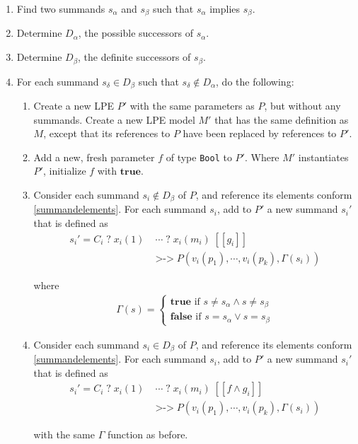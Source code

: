 \begin{enumerate}
\item Find two summands $s_\alpha$ and $s_\beta$ such that $s_\alpha$ implies $s_\beta$.
\item Determine $D_\alpha$, the possible successors of $s_\alpha$.
\item Determine $D_\beta$, the definite successors of $s_\beta$.
\item For each summand $s_\delta \in D_\beta$ such that $s_\delta \notin D_\alpha$, do the following:
\begin{enumerate}
\item Create a new LPE $P'$ with the same parameters as $P$, but without any summands.
Create a new LPE model $M'$ that has the same definition as $M$, except that its references to $P$ have been replaced by references to $P'$.

\item Add a new, fresh parameter $f$ of type \texttt{Bool} to $P'$.
Where $M'$ instantiates $P'$, initialize $f$ with $\textbf{true}$.

\item Consider each summand $s_i \notin D_\beta$ of $P$, and reference its elements conform \ref{summandelements}.
For each summand $s_i$, add to $P'$ a new summand ${s_i}'$ that is defined as
\begin{align*}
{s_i}' = C_i \; \texttt{?} \; x_i(1) \; &\cdots{} \; \texttt{?} \; x_i(m_i) \; [[g_i]] \\
&\texttt{>->} \; P(v_i(p_1), \cdots{}, v_i(p_k), \Gamma(s_i))
\end{align*}

where
\begin{align*}
\Gamma(s) = \begin{cases}
\textbf{true} \text{ if } s \neq s_\alpha \land s \neq s_\beta \\
\textbf{false} \text{ if } s = s_\alpha \lor s = s_\beta
\end{cases}
\end{align*}

\item Consider each summand $s_i \in D_\beta$ of $P$, and reference its elements conform \ref{summandelements}.
For each summand $s_i$, add to $P'$ a new summand ${s_i}'$ that is defined as
\begin{align*}
{s_i}' = C_i \; \texttt{?} \; x_i(1) \; &\cdots{} \; \texttt{?} \; x_i(m_i) \; [[f \land g_i]] \\
&\texttt{>->} \; P(v_i(p_1), \cdots{}, v_i(p_k), \Gamma(s_i))
\end{align*}

with the same $\Gamma$ function as before.
\end{enumerate}
\end{enumerate}

